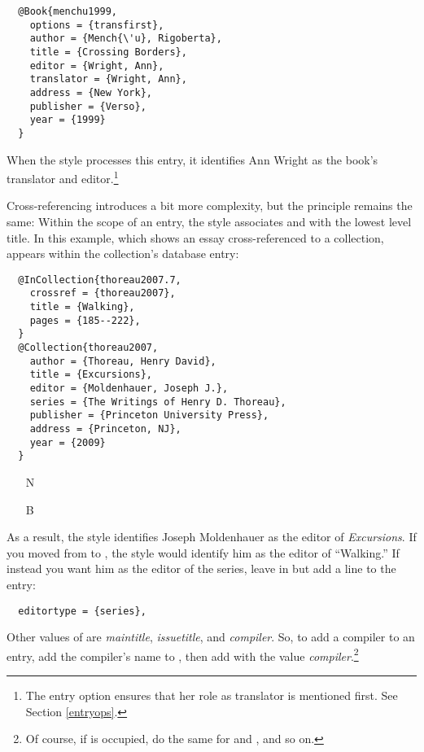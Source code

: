 \documentclass[11pt,letterpaper,oneside]{article}
\begin{document}
\begin{lstlisting}
  @Book{menchu1999,
    options = {transfirst},
    author = {Mench{\'u}, Rigoberta},
    title = {Crossing Borders},
    editor = {Wright, Ann},
    translator = {Wright, Ann},
    address = {New York},
    publisher = {Verso},
    year = {1999}
  }
\end{lstlisting}

\noindent When the style processes this entry, it identifies Ann
Wright as the book's translator and editor.\footnote{The entry option
 ensures that her role as translator is mentioned
first. See Section \ref{entryops}.}

Cross-referencing introduces a bit more complexity, but the principle
remains the same: Within the scope of an entry, the style associates
 and  with the lowest level
title. In this example, which shows an essay cross-referenced to a
collection,  appears within the collection's database
entry:

\begin{lstlisting}
  @InCollection{thoreau2007.7,
    crossref = {thoreau2007},
    title = {Walking},
    pages = {185--222},
  }
  @Collection{thoreau2007,
    author = {Thoreau, Henry David},
    title = {Excursions},
    editor = {Moldenhauer, Joseph J.},
    series = {The Writings of Henry D. Thoreau},
    publisher = {Princeton University Press},
    address = {Princeton, NJ},
    year = {2009}
  }
\end{lstlisting}

\begin{itemize}
\item[N] 

\item[B] 
\end{itemize}

\noindent As a result, the style identifies Joseph Moldenhauer as the
editor of \textit{Excursions}. If you moved  from
 to , the
style would identify him as the editor of ``Walking.'' If instead you
want him as the editor of the series, leave  in
 but add a line to the entry:

\begin{lstlisting}
  editortype = {series},
\end{lstlisting}

Other values of  are \textit{maintitle},
\textit{issuetitle}, and \textit{compiler}. So, to add a compiler to
an entry, add the compiler's name to , then add
 with the value \textit{compiler}.\footnote{Of
course, if  is occupied, do the same for
 and , and so on.}
\end{document}
